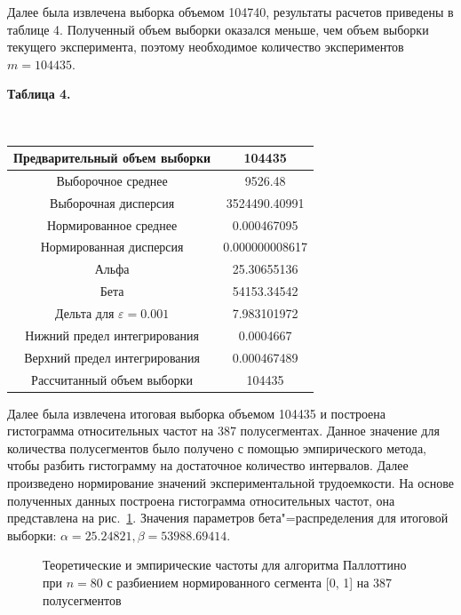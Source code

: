 \documentclass[a4paper, article, 14pt]{extarticle}
\begin{document}
Далее была извлечена выборка объемом 104740, результаты расчетов приведены в таблице 4. Полученный объем выборки оказался меньше, чем объем выборки текущего эксперимента, поэтому необходимое количество экспериментов $m = 104435$.

\begin{center}\label{table4}
	\begin{small}
		\textbf{Таблица 4.}
	\end{small}\\
	\hfill \break
	\begin{tabular}{|c|c|}
		\hline
		Предварительный объем выборки & 104435\\
		\hline
		Выборочное среднее & 9526.48\\
		\hline
		Выборочная дисперсия & 3524490.40991\\
		\hline
		Нормированное среднее & 0.000467095\\
		\hline
		Нормированная дисперсия & 0.000000008617\\
		\hline
		Альфа & 25.30655136\\
		\hline
		Бета & 54153.34542\\
		\hline
		Дельта для $\varepsilon = 0.001$ & 7.983101972\\
		\hline
		Нижний предел интегрирования & 0.0004667\\
		\hline
		Верхний предел интегрирования & 0.000467489\\
		\hline
		Рассчитанный объем выборки & 104435\\
		\hline
	\end{tabular}
\end{center}

Далее была извлечена итоговая выборка объемом 104435 и построена гистограмма относительных частот на 387 полусегментах. Данное значение для количества полусегментов было получено с помощью эмпирического метода, чтобы разбить гистограмму на достаточное количество интервалов. Далее произведено нормирование значений экспериментальной трудоемкости. На основе полученных данных построена гистограмма относительных частот, она представлена на рис.~\ref{fig:histogram}. Значения параметров бета"=распределения для итоговой выборки: $\alpha = 25.24821, \beta = 53988.69414$.

\begin{figure}[!]
	\caption{Теоретические и эмпирические частоты для алгоритма Паллоттино при $n = 80$ с разбиением нормированного сегмента [0, 1] на 387 полусегментов}
	\label{fig:histogram}
\end{figure}
\end{document}
